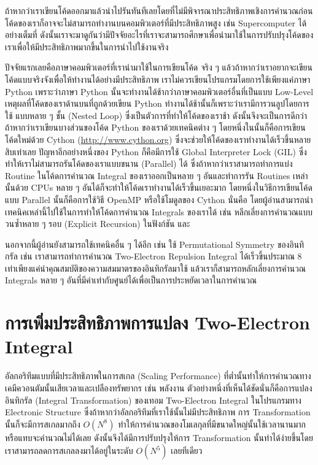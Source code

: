 ถ้าหากว่าเราเขียนโค้ดออกมาแล้วนำไปรันทันทีเลยโดยที่ไม่มีพิจารณาประสิทธิภาพเชิงการคำนวณก่อน โค้ดของเราก็อาจจะไม่สามารถทำงานบนคอมพิวเตอร์ที่มีประสิทธิภาพสูง เช่น Supercomputer ได้อย่างเต็มที่ ดังนั้นเราจะมาดูกันว่ามีปัจจัยอะไรที่เราจะสามารถศึกษาเพื่อนำมาใช้ในการปรับปรุงโค้ดของเราเพื่อให้มีประสิทธิภาพมากขึ้นในการนำไปใช้งานจริง

ปัจจัยแรกเลยคือภาษาคอมพิวเตอร์ที่เรานำมาใช้ในการเขียนโค้ด จริง ๆ แล้วถ้าหากว่าเราอยากจะเขียนโค้ดแบบจริงจังเพื่อให้ทำงานได้อย่างมีประสิทธิภาพ เราไม่ควรเขียนโปรแกรมโดยการใช้เพียงแค่ภาษา Python เพราะว่าภาษา Python นั้นจะทำงานได้ช้ากว่าภาษาคอมพิวเตอร์อื่นที่เป็นแบบ Low-Level เหตุผลที่โค้ดของเราด้านบนที่ถูกด้วยเขียน Python ทำงานได้ช้านั้นก็เพราะว่าเรามีการวนลูปโดยการใช้  แบบหลาย ๆ ชั้น (Nested Loop) ซึ่งเป็นตัวการที่ทำให้โค้ดของเราช้า ดังนั้นจึงจะเป็นการดีกว่าถ้าหากว่าเราเขียนบางส่วนของโค้ด Python ของเราด้วยเทคนิคต่าง ๆ โดยหนึ่งในนั้นก็คือการเขียนโค้ดใหม่ด้วย Cython (\url{http://www.cython.org}) ซึ่งจะช่วยให้โค้ดของเราทำงานได้เร็วขึ้นหลายสิบเท่าเลย ปัญหาอีกอย่างหนึ่งของ Python ก็คือมีการใช้ Global Interpreter Lock (GIL) ซึ่งทำให้เราไม่สามารถรันโค้ดของเราแบบขนาน (Parallel) ได้ ซึ่งถ้าหากว่าเราสามารถทำการแบ่ง Routine ในโค้ดการคำนวณ Integral ของเราออกเป็นหลาย ๆ อันและทำการรัน Routines เหล่านั้นด้วย CPUs หลาย ๆ อันได้ก็จะทำให้โค้ดเราทำงานได้เร็วขึ้นเยอะมาก โดยหนึ่งในวิธีการเขียนโค้ดแบบ Parallel นั้นก็คือการใช้วิธี OpenMP หรือใช้โมดูลของ Cython นั่นคือ  โดยผู้อ่านสามารถนำเทคนิคเหล่านี้ไปใช้ในการทำให้โค้ดการคำนวณ Integrals ของเราได้ เช่น หลีกเลี่ยงการคำนวณแบบวนซ้ำหลาย ๆ รอบ (Explicit Recursion) ในฟังก์ชัน  และ 

นอกจากนี้ผู้อ่านยังสามารถใช้เทคนิคอื่น ๆ ได้อีก เช่น ใช้ Permutational Symmetry ของอินทิกรัล เช่น เราสามารถทำการคำนวณ Two-Electron Repulsion Integral ได้เร็วขึ้นประมาณ 8 เท่าเพียงแค่นำคุณสมบัติของความสมมาตรของอินทิกรัลมาใช้ แล้วเราก็สามารถหลักเลี่ยงการคำนวณ Integrals หลาย ๆ อันที่มีค่าเท่ากับศูนย์ได้เพื่อเป็นการประหยัดเวลาในการคำนวณ

\section{การเพิ่มประสิทธิภาพการแปลง Two-Electron Integral}

อัลกอริทึมแบบที่มีประสิทธิภาพในการสเกล (Scaling Performance) ที่ต่ำนั้นทำให้การคำนวณทางเคมีควอนตัมนั้นเสียเวลาและเปลืองทรัพยากร เช่น พลังงาน ตัวอย่างหนึ่งที่เห็นได้ชัดนั่นก็คือการแปลงอินทิกรัล (Integral Transformation) ของเทอม Two-Electron Integral ในโปรแกรมทาง Electronic Structure ซึ่งถ้าหากว่าอัลกอริทึมที่เราใช้นั้นไม่มีประสิทธิภาพ การ Transformation นั้นก็จะมีการสเกลมากถึง $O(N^{8})$ ทำให้การคำนวณของโมเลกุลที่มีขนาดใหญ่นั้นใช้เวลานานมากหรือแทบจะคำนวณไม่ได้เลย ดังนั้นจึงได้มีการปรับปรุงให้การ Transformation นั้นทำได้ง่ายขึ้นโดยเราสามารถลดการสเกลลงมาได้อยู่ในระดับ $O(N^{5})$ เลยทีเดียว


